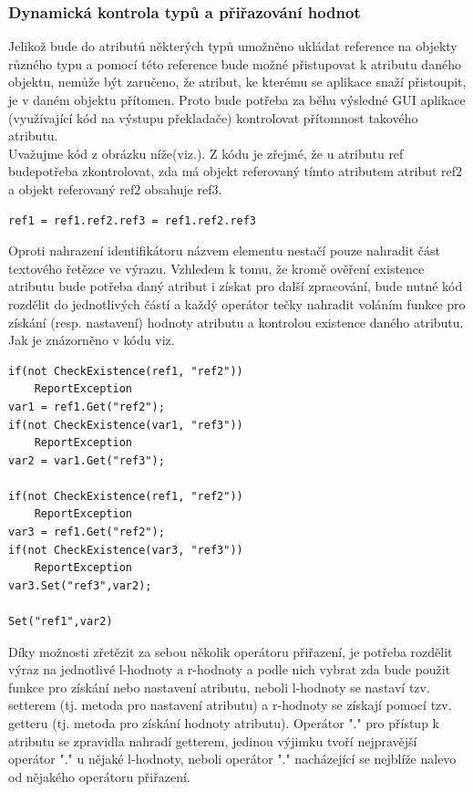 \documentclass[report,11pt]{elsarticle}
\begin{document}
\subsubsection{\label{SEC:Intro}Dynamická kontrola typů a přiřazování hodnot}
Jelikož bude do atributů některých typů umožněno ukládat reference na objekty různého typu a pomocí této reference bude možné přistupovat k atributu daného objektu, nemůže být zaručeno, že atribut, ke kterému se aplikace snaží přistoupit, je v daném objektu přítomen. Proto bude potřeba za běhu výsledné GUI aplikace (využívající kód na výstupu překladače) kontrolovat přítomnost takového atributu.\\
Uvažujme kód z obrázku níže(viz.). Z kódu je zřejmé, že u atributu ref budepotřeba zkontrolovat, zda má objekt referovaný tímto atributem atribut ref2 a objekt referovaný ref2 obsahuje ref3.

\begin{lstlisting}[frame=single,caption=Pseudokód problematického použití operátoru "." v přiřazovacím výroku. ]
ref1 = ref1.ref2.ref3 = ref1.ref2.ref3
\end{lstlisting}
Oproti nahrazení identifikátoru názvem elementu nestačí pouze nahradit část textového řetězce ve výrazu. Vzhledem k tomu, že kromě ověření existence atributu bude potřeba daný atribut i získat pro další zpracování, bude nutné kód rozdělit do jednotlivých částí a každý operátor tečky nahradit voláním funkce pro získání (resp. nastavení) hodnoty atributu a kontrolou existence daného atributu.  Jak je znázorněno v kódu viz.
\begin{lstlisting}[frame=single,caption=Řešení v pseudokódu problematického použití operátoru "." v přiřazovacím výroku. ]
if(not CheckExistence(ref1, "ref2"))
	ReportException
var1 = ref1.Get("ref2");
if(not CheckExistence(var1, "ref3"))
	ReportException
var2 = var1.Get("ref3");

if(not CheckExistence(ref1, "ref2"))
	ReportException
var3 = ref1.Get("ref2");
if(not CheckExistence(var3, "ref3"))
	ReportException
var3.Set("ref3",var2);

Set("ref1",var2)
\end{lstlisting}
Díky možnosti zřetězit za sebou několik operátoru přiřazení, je potřeba rozdělit výraz na jednotlivé l-hodnoty a r-hodnoty a podle nich vybrat zda bude použit funkce pro získání nebo nastavení atributu, neboli l-hodnoty se nastaví tzv. setterem (tj. metoda pro nastavení atributu) a r-hodnoty se získají pomocí tzv. getteru (tj. metoda pro získání hodnoty atributu). Operátor "." pro přístup k atributu se zpravidla nahradí getterem, jedinou výjimku tvoří nejpravější operátor "." u nějaké l-hodnoty, neboli operátor "." nacházející se nejblíže nalevo od nějakého operátoru přiřazení.
\end{document}
